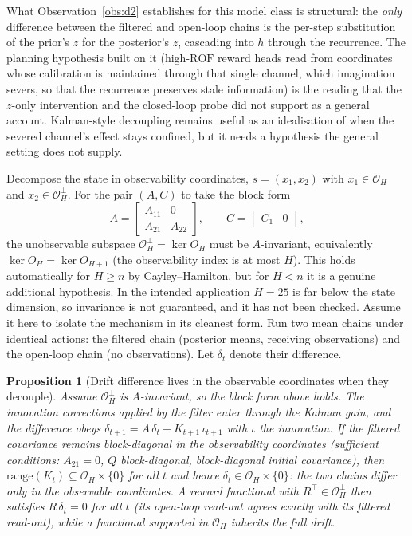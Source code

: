 \documentclass[11pt]{article}
\newtheorem{proposition}{Proposition}
\theoremstyle{remark}
\newcommand{\Obs}{\mathcal{O}}
\newcommand{\ROF}{\mathrm{ROF}}
\begin{document}
What Observation~\ref{obs:d2} establishes for this model class is structural: the \emph{only} difference between the filtered and open-loop chains is the per-step substitution of the prior's $z$ for the posterior's $z$, cascading into $h$ through the recurrence. The planning hypothesis built on it (high-$\ROF$ reward heads read from coordinates whose calibration is maintained through that single channel, which imagination severs, so that the recurrence preserves stale information) is the reading that the $z$-only intervention and the closed-loop probe did not support as a general account. Kalman-style decoupling remains useful as an idealisation of when the severed channel's effect stays confined, but it needs a hypothesis the general setting does not supply.

Decompose the state in observability coordinates, $s = (x_1, x_2)$ with $x_1 \in \Obs_H$ and $x_2 \in \Obs_H^\perp$. For the pair $(A, C)$ to take the block form
\[
A = \begin{bmatrix} A_{11} & 0 \\ A_{21} & A_{22} \end{bmatrix},
\qquad
C = \begin{bmatrix} C_1 & 0 \end{bmatrix},
\]
the unobservable subspace $\Obs_H^\perp = \ker O_H$ must be $A$-invariant, equivalently $\ker O_H = \ker O_{H+1}$ (the observability index is at most $H$). This holds automatically for $H \ge n$ by Cayley--Hamilton, but for $H < n$ it is a genuine additional hypothesis. In the intended application $H = 25$ is far below the state dimension, so invariance is not guaranteed, and it has not been checked. Assume it here to isolate the mechanism in its cleanest form. Run two mean chains under identical actions: the filtered chain (posterior means, receiving observations) and the open-loop chain (no observations). Let $\delta_t$ denote their difference.

\begin{proposition}[Drift difference lives in the observable coordinates when they decouple]\label{prop:drift}
Assume $\Obs_H^\perp$ is $A$-invariant, so the block form above holds. The innovation corrections applied by the filter enter through the Kalman gain, and the difference obeys $\delta_{t+1} = A\,\delta_t + K_{t+1}\,\iota_{t+1}$ with $\iota$ the innovation. If the filtered covariance remains block-diagonal in the observability coordinates (sufficient conditions: $A_{21} = 0$, $Q$ block-diagonal, block-diagonal initial covariance), then $\mathrm{range}(K_t) \subseteq \Obs_H \times \{0\}$ for all $t$ and hence $\delta_t \in \Obs_H \times \{0\}$: the two chains differ only in the observable coordinates. A reward functional with $R^\top \in \Obs_H^\perp$ then satisfies $R\,\delta_t = 0$ for all $t$ (its open-loop read-out agrees exactly with its filtered read-out), while a functional supported in $\Obs_H$ inherits the full drift.
\end{proposition}
\end{document}
